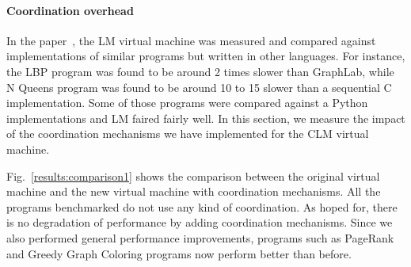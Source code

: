 \paragraph{Coordination overhead}

In the paper~\cite{cruz-ppdp14}, the LM virtual machine was measured and
compared against implementations of similar programs but written in other
languages. For instance, the LBP program was found to be around 2 times slower
than GraphLab, while N Queens program was found to be around 10 to 15 slower
than a sequential C implementation. Some of those programs were compared against
a Python implementations and LM faired fairly well. In this section, we measure
the impact of the coordination mechanisms we have implemented for the CLM
virtual machine.

Fig.~\ref{results:comparison1} shows the comparison between the original virtual
machine and the new virtual machine with coordination mechanisms. All the
programs benchmarked do not use any kind of coordination. As hoped for, there
is no degradation of performance by adding coordination mechanisms. Since we also
performed general performance improvements, programs such as PageRank and Greedy
Graph Coloring programs now perform better than before.

\begin{topfig}
   \begin{center}
   \end{center}
\end{topfig}
